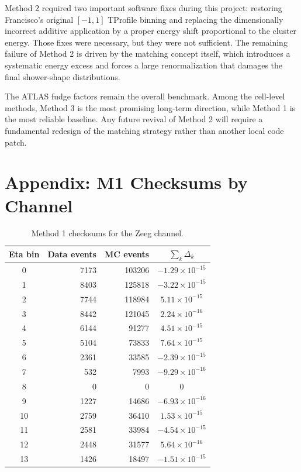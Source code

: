 \documentclass[11pt,a4paper]{article}
\begin{document}
Method 2 required two important software fixes during this project: restoring
Francisco's original $[-1,1]$ TProfile binning and replacing the dimensionally
incorrect additive application by a proper energy shift proportional to the
cluster energy. Those fixes were necessary, but they were not sufficient. The
remaining failure of Method 2 is driven by the matching concept itself, which
introduces a systematic energy excess and forces a large renormalization that
damages the final shower-shape distributions.

The ATLAS fudge factors remain the overall benchmark. Among the cell-level
methods, Method 3 is the most promising long-term direction, while Method 1 is
the most reliable baseline. Any future revival of Method 2 will require a
fundamental redesign of the matching strategy rather than another local code
patch.

\appendix

\section{Appendix: M1 Checksums by Channel}

\begin{table}[H]
\centering
\caption{Method 1 checksums for the Zeeg channel.}
\begin{tabular}{crrc}
\toprule
Eta bin & Data events & MC events & $\sum_k \Delta_k$ \\
\midrule
0 & 7173 & 103206 & $-1.29 \times 10^{-15}$ \\
1 & 8403 & 125818 & $-3.22 \times 10^{-15}$ \\
2 & 7744 & 118984 & $5.11 \times 10^{-15}$ \\
3 & 8442 & 121045 & $2.24 \times 10^{-16}$ \\
4 & 6144 & 91277 & $4.51 \times 10^{-15}$ \\
5 & 5104 & 73833 & $7.64 \times 10^{-15}$ \\
6 & 2361 & 33585 & $-2.39 \times 10^{-15}$ \\
7 & 532 & 7993 & $-9.29 \times 10^{-16}$ \\
8 & 0 & 0 & 0 \\
9 & 1227 & 14686 & $-6.93 \times 10^{-16}$ \\
10 & 2759 & 36410 & $1.53 \times 10^{-15}$ \\
11 & 2581 & 33984 & $-4.54 \times 10^{-15}$ \\
12 & 2448 & 31577 & $5.64 \times 10^{-16}$ \\
13 & 1426 & 18497 & $-1.51 \times 10^{-15}$ \\
\bottomrule
\end{tabular}
\end{table}
\end{document}

